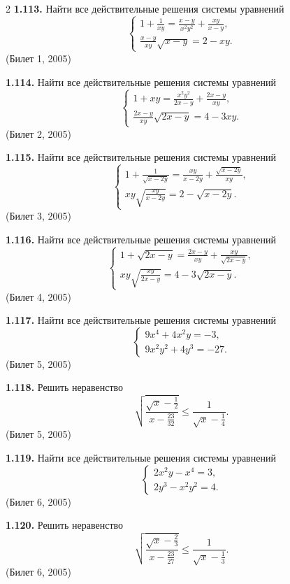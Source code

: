 \documentclass[14pt,a4paper,landscape]{extarticle}
\begin{document}
\begin{multicols}{2}
\textbf{1.113.} Найти все действительные решения системы уравнений
\[
\begin{cases}
1 + \frac{1}{xy} = \frac{x-y}{x^2y^2} + \frac{xy}{x-y}, \\[1ex]
\frac{x-y}{xy}\sqrt{x-y} = 2 - xy.
\end{cases}
\]
\hfill \textnormal{(Билет 1, 2005)}

\textbf{1.114.} Найти все действительные решения системы уравнений
\[
\begin{cases}
1 + xy = \frac{x^2y^2}{2x-y} + \frac{2x-y}{xy}, \\[1ex]
\frac{2x-y}{xy}\sqrt{2x-y} = 4 - 3xy.
\end{cases}
\]
\hfill \textnormal{(Билет 2, 2005)}

\textbf{1.115.} Найти все действительные решения системы уравнений
\[
\begin{cases}
1 + \frac{1}{\sqrt{x-2y}} = \frac{xy}{x-2y} + \frac{\sqrt{x-2y}}{xy}, \\[1ex]
xy\sqrt{\frac{xy}{x-2y}} = 2 - \sqrt{x-2y}.
\end{cases}
\]
\hfill \textnormal{(Билет 3, 2005)}

\textbf{1.116.} Найти все действительные решения системы уравнений
\[
\begin{cases}
1 + \sqrt{2x-y} = \frac{2x-y}{xy} + \frac{xy}{\sqrt{2x-y}}, \\[1ex]
xy\sqrt{\frac{xy}{2x-y}} = 4 - 3\sqrt{2x-y}.
\end{cases}
\]
\hfill \textnormal{(Билет 4, 2005)}

\textbf{1.117.} Найти все действительные решения системы уравнений
\[
\begin{cases}
9x^4 + 4x^2y = -3, \\
9x^2y^2 + 4y^3 = -27.
\end{cases}
\]
\hfill \textnormal{(Билет 5, 2005)}

\textbf{1.118.} Решить неравенство
\[
\sqrt{\frac{\sqrt{x} - \frac{1}{2}}{x - \frac{23}{32}}} \leqslant \frac{1}{\sqrt{x} - \frac{1}{4}}.
\]
\hfill \textnormal{(Билет 5, 2005)}

\textbf{1.119.} Найти все действительные решения системы уравнений
\[
\begin{cases}
2x^2y - x^4 = 3, \\
2y^3 - x^2y^2 = 4.
\end{cases}
\]
\hfill \textnormal{(Билет 6, 2005)}

\textbf{1.120.} Решить неравенство
\[
\sqrt{\frac{\sqrt{x} - \frac{2}{3}}{x - \frac{23}{27}}} \leqslant \frac{1}{\sqrt{x} - \frac{1}{3}}.
\]
\hfill \textnormal{(Билет 6, 2005)}


\end{multicols}
\end{document}
